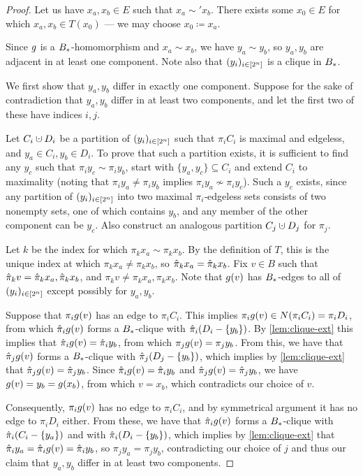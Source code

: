 \documentclass{amsart}
\theoremstyle{definition}
\newcommand{\cupdot}{\mathbin{\mathaccent\cdot\cup}}
\begin{document}
\begin{proof} 

  Let us have $x_a, x_b \in E$ such that $x_a \sim' x_b$. There exists some $x_0 \in E$ for which $x_a, x_b \in T(x_0)$ --- we may choose $x_0 \coloneqq x_a$.

  Since $g$ is a $B_*$-homomorphism and $x_a \sim x_b$, we have $y_a \sim y_b$, so $y_a, y_b$ are adjacent in at least one component. Note also that $(y_i)_{i \in [2^n]}$ is a clique in $B_*$.

  We first show that $y_a, y_b$ differ in exactly one component.
  Suppose for the sake of contradiction that $y_a, y_b$ differ in at least two components, and let the first two of these have indices $i, j$.

  Let $C_i \cupdot D_i$ be a partition of $(y_i)_{i \in [2^n]}$ such that $\pi_i C_i$ is maximal and edgeless, and $y_a \in C_i, y_b \in D_i$. To prove that such a partition exists, it is sufficient to find any $y_c$ such that $\pi_i y_c \sim \pi_i y_b$, start with $\{y_a, y_c\} \subseteq C_i$ and extend $C_i$ to maximality (noting that $\pi_i y_a \neq \pi_i y_b$ implies $\pi_i y_a \nsim \pi_i y_c$). Such a $y_c$ exists, since any partition of $(y_i)_{i \in [2^n]}$ into two maximal $\pi_i$‑edgeless sets consists of two nonempty sets, one of which contains $y_b$, and any member of the other component can be $y_c$.
  Also construct an analogous partition $C_j \cupdot D_j$ for $\pi_j$.

  Let $k$ be the index for which $\pi_k x_a \sim \pi_k x_b$. By the definition of $T$, this is the unique index at which $\pi_k x_a \neq \pi_k x_b$, so $\hat{\pi}_k x_a = \hat{\pi}_k x_b$. Fix $v \in B$ such
  that $\hat{\pi}_k v = \hat{\pi}_k x_a, \hat{\pi}_k x_b$, and $\pi_k v \neq \pi_k x_a, \pi_k x_b$. Note that $g(v)$ has $B_*$-edges to all of $(y_i)_{i \in [2^n]}$ except possibly for $y_a, y_b$.

  Suppose that $\pi_i g(v)$ has an edge to $\pi_i C_i$. This implies $\pi_i g(v) \in N(\pi_i C_i) = \pi_i D_i$,
  from which $\hat{\pi}_i g(v)$ forms a $B_*$-clique with $\hat{\pi}_i (D_i - \{y_b\})$. By \autoref{lem:clique-ext} this implies that $\hat{\pi}_i g(v) = \hat{\pi}_i y_b$, from which $\pi_j g(v) = \pi_j y_b$. From this, we have that $\hat{\pi}_j g(v)$ forms a $B_*$-clique with $\hat{\pi}_j (D_j - \{y_b\})$, which implies by \autoref{lem:clique-ext} that $\hat{\pi}_j g(v) = \hat{\pi}_j y_b$. Since $\hat{\pi}_i g(v) = \hat{\pi}_i y_b$ and $\hat{\pi}_j g(v) = \hat{\pi}_j y_b$, we have $g(v) = y_b = g(x_b)$, from which $v = x_b$, which contradicts our choice of $v$.

  Consequently, $\pi_i g(v)$ has no edge to $\pi_i C_i$, and by symmetrical argument it has no edge to $\pi_i D_i$ either. From these, we have that $\hat{\pi}_i g(v)$ forms a $B_*$-clique with $\hat{\pi}_i (C_i - \{y_a\})$ and with $\hat{\pi}_i (D_i - \{y_b\})$, which implies by \autoref{lem:clique-ext} that $\hat{\pi}_i y_a = \hat{\pi}_i g(v) = \hat{\pi}_i y_b$, so $\pi_j y_a = \pi_j y_b$, contradicting our choice of $j$ and thus our claim that $y_a, y_b$ differ in at least two components.


\end{proof}
\end{document}
